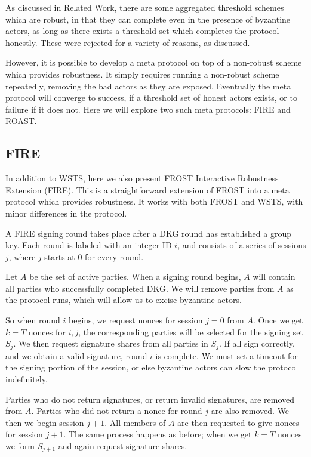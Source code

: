 \documentclass{article}
\theoremstyle{plain}
\theoremstyle{definition}
\theoremstyle{remark}
\begin{document}
As discussed in Related Work, there are some aggregated threshold schemes which are robust, in that they can complete even in the presence of byzantine actors, as long as there exists a threshold set which completes the protocol honestly.  These were rejected for a variety of reasons, as discussed.

However, it is possible to develop a meta protocol on top of a non-robust scheme which provides robustness.  It simply requires running a non-robust scheme repeatedly, removing the bad actors as they are exposed.  Eventually the meta protocol will converge to success, if a threshold set of honest actors exists, or to failure if it does not.  Here we will explore two such meta protocols: FIRE and ROAST.

\subsection{
  FIRE
}

In addition to WSTS, here we also present FROST Interactive Robustness Extension (FIRE).  This is a straightforward extension of FROST into a meta protocol which provides robustness.  It works with both FROST and WSTS, with minor differences in the protocol.

A FIRE signing round takes place after a DKG round has established a group key.  Each round is labeled with an integer ID $i$, and consists of a series of sessions $j$, where $j$ starts at $0$ for every round.

Let $A$ be the set of active parties.  When a signing round begins, $A$ will contain all parties who successfully completed DKG.  We will remove parties from $A$ as the protocol runs, which will allow us to excise byzantine actors.

So when round $i$ begins, we request nonces for session $j = 0$ from $A$.  Once we get $k = T$ nonces for $i,j$, the corresponding parties will be selected for the signing set $S_j$.  We then request signature shares from all parties in $S_j$.  If all sign correctly, and we obtain a valid signature, round $i$ is complete.  We must set a timeout for the signing portion of the session, or else byzantine actors can slow the protocol indefinitely.

Parties who do not return signatures, or return invalid signatures, are removed from $A$.  Parties who did not return a nonce for round $j$ are also removed.  We then we begin session $j+1$.  All members of $A$ are then requested to give nonces for session $j+1$.  The same process happens as before; when we get $k = T$ nonces we form $S_{j+1}$ and again request signature shares.
\end{document}
